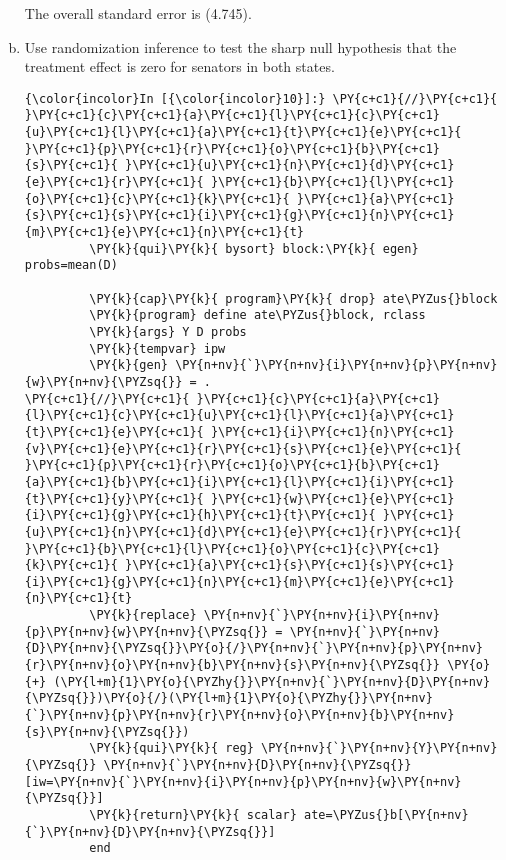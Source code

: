\documentclass[11pt,notitlepage]{article}\usepackage[]{graphicx}\usepackage[]{color}
\makeatletter
\newenvironment{kframe}{%
 \def\at@end@of@kframe{}%
 \ifinner\ifhmode%
  \def\at@end@of@kframe{\end{minipage}}%
  \begin{minipage}{\columnwidth}%
 \fi\fi%
 \def\FrameCommand##1{\hskip\@totalleftmargin \hskip-\fboxsep
 \colorbox{shadecolor}{##1}\hskip-\fboxsep
     \hskip-\linewidth \hskip-\@totalleftmargin \hskip\columnwidth}%
 \MakeFramed {\advance\hsize-\width
   \@totalleftmargin\z@ \linewidth\hsize
   \@setminipage}}%
 {\par\unskip\endMakeFramed%
 \at@end@of@kframe}
\newenvironment{knitrout}{}{} %
\makeatother
\begin{document}
\begin{enumerate}[a)]
The overall standard error is (4.745).

\item Use randomization inference to test the sharp null hypothesis that the treatment effect is zero for senators in both states.

\begin{knitrout}
\color{fgcolor}\begin{kframe}
   \begin{Verbatim}[commandchars=\\\{\}]
{\color{incolor}In [{\color{incolor}10}]:} \PY{c+c1}{//}\PY{c+c1}{ }\PY{c+c1}{c}\PY{c+c1}{a}\PY{c+c1}{l}\PY{c+c1}{c}\PY{c+c1}{u}\PY{c+c1}{l}\PY{c+c1}{a}\PY{c+c1}{t}\PY{c+c1}{e}\PY{c+c1}{ }\PY{c+c1}{p}\PY{c+c1}{r}\PY{c+c1}{o}\PY{c+c1}{b}\PY{c+c1}{s}\PY{c+c1}{ }\PY{c+c1}{u}\PY{c+c1}{n}\PY{c+c1}{d}\PY{c+c1}{e}\PY{c+c1}{r}\PY{c+c1}{ }\PY{c+c1}{b}\PY{c+c1}{l}\PY{c+c1}{o}\PY{c+c1}{c}\PY{c+c1}{k}\PY{c+c1}{ }\PY{c+c1}{a}\PY{c+c1}{s}\PY{c+c1}{s}\PY{c+c1}{i}\PY{c+c1}{g}\PY{c+c1}{n}\PY{c+c1}{m}\PY{c+c1}{e}\PY{c+c1}{n}\PY{c+c1}{t}
         \PY{k}{qui}\PY{k}{ bysort} block:\PY{k}{ egen} probs=mean(D)
         
         \PY{k}{cap}\PY{k}{ program}\PY{k}{ drop} ate\PYZus{}block	
         \PY{k}{program} define ate\PYZus{}block, rclass
         \PY{k}{args} Y D probs
         \PY{k}{tempvar} ipw
         \PY{k}{gen} \PY{n+nv}{`}\PY{n+nv}{i}\PY{n+nv}{p}\PY{n+nv}{w}\PY{n+nv}{\PYZsq{}} = .
\PY{c+c1}{//}\PY{c+c1}{ }\PY{c+c1}{c}\PY{c+c1}{a}\PY{c+c1}{l}\PY{c+c1}{c}\PY{c+c1}{u}\PY{c+c1}{l}\PY{c+c1}{a}\PY{c+c1}{t}\PY{c+c1}{e}\PY{c+c1}{ }\PY{c+c1}{i}\PY{c+c1}{n}\PY{c+c1}{v}\PY{c+c1}{e}\PY{c+c1}{r}\PY{c+c1}{s}\PY{c+c1}{e}\PY{c+c1}{ }\PY{c+c1}{p}\PY{c+c1}{r}\PY{c+c1}{o}\PY{c+c1}{b}\PY{c+c1}{a}\PY{c+c1}{b}\PY{c+c1}{i}\PY{c+c1}{l}\PY{c+c1}{i}\PY{c+c1}{t}\PY{c+c1}{y}\PY{c+c1}{ }\PY{c+c1}{w}\PY{c+c1}{e}\PY{c+c1}{i}\PY{c+c1}{g}\PY{c+c1}{h}\PY{c+c1}{t}\PY{c+c1}{ }\PY{c+c1}{u}\PY{c+c1}{n}\PY{c+c1}{d}\PY{c+c1}{e}\PY{c+c1}{r}\PY{c+c1}{ }\PY{c+c1}{b}\PY{c+c1}{l}\PY{c+c1}{o}\PY{c+c1}{c}\PY{c+c1}{k}\PY{c+c1}{ }\PY{c+c1}{a}\PY{c+c1}{s}\PY{c+c1}{s}\PY{c+c1}{i}\PY{c+c1}{g}\PY{c+c1}{n}\PY{c+c1}{m}\PY{c+c1}{e}\PY{c+c1}{n}\PY{c+c1}{t}
         \PY{k}{replace} \PY{n+nv}{`}\PY{n+nv}{i}\PY{n+nv}{p}\PY{n+nv}{w}\PY{n+nv}{\PYZsq{}} = \PY{n+nv}{`}\PY{n+nv}{D}\PY{n+nv}{\PYZsq{}}\PY{o}{/}\PY{n+nv}{`}\PY{n+nv}{p}\PY{n+nv}{r}\PY{n+nv}{o}\PY{n+nv}{b}\PY{n+nv}{s}\PY{n+nv}{\PYZsq{}} \PY{o}{+} (\PY{l+m}{1}\PY{o}{\PYZhy{}}\PY{n+nv}{`}\PY{n+nv}{D}\PY{n+nv}{\PYZsq{}})\PY{o}{/}(\PY{l+m}{1}\PY{o}{\PYZhy{}}\PY{n+nv}{`}\PY{n+nv}{p}\PY{n+nv}{r}\PY{n+nv}{o}\PY{n+nv}{b}\PY{n+nv}{s}\PY{n+nv}{\PYZsq{}})
         \PY{k}{qui}\PY{k}{ reg} \PY{n+nv}{`}\PY{n+nv}{Y}\PY{n+nv}{\PYZsq{}} \PY{n+nv}{`}\PY{n+nv}{D}\PY{n+nv}{\PYZsq{}} [iw=\PY{n+nv}{`}\PY{n+nv}{i}\PY{n+nv}{p}\PY{n+nv}{w}\PY{n+nv}{\PYZsq{}}]
         \PY{k}{return}\PY{k}{ scalar} ate=\PYZus{}b[\PY{n+nv}{`}\PY{n+nv}{D}\PY{n+nv}{\PYZsq{}}]
         end
\end{Verbatim}


\end{kframe}
\end{knitrout}
\end{enumerate}
\end{document}
